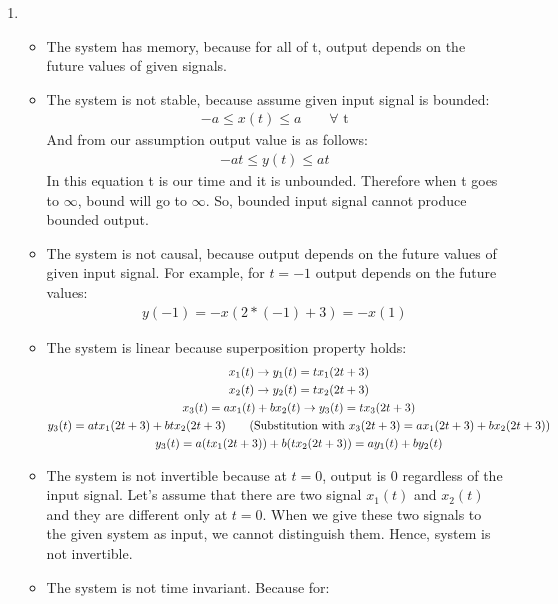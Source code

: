 \documentclass[10pt,a4paper, margin=1in]{article}
\begin{document}
\begin{enumerate}
\begin{enumerate}
    \item %
    \begin{itemize}
        \item The system has memory, because for all of t, output depends on the future values of given signals. \\
        \item The system is not stable, because assume given input signal is bounded:
        \begin{gather*}
        -a \le x(t) \le a  \text{$\qquad \forall$ t}
        \end{gather*}
        And from our assumption output value is as follows:
        \begin{gather*}
            -at \le y(t) \le at
        \end{gather*}
        In this equation t is our time and it is unbounded. Therefore when t goes to $\infty$, bound will go to $\infty$. So, bounded input signal cannot produce bounded output. \\
        \item  The system is not causal, because output depends on the future values of given input signal. For example, for $t=-1$ output depends on the future values:
        \begin{gather*}
            y(-1) = - x(2*(-1)+3) = -x(1)
        \end{gather*}
        \item The system is linear because superposition property holds:
            \begin{gather*}
            x_1(t) \rightarrow y_1(t)=tx_1(2t+3) \\
            x_2(t) \rightarrow y_2(t)=tx_2(2t+3) \\
            x_3(t)=ax_1(t)+bx_2(t) \rightarrow y_3(t)=tx_3(2t+3) \\
            y_3(t)= atx_1(2t+3)+btx_2(2t+3) \text{\qquad (Substitution with $x_3(2t+3) = ax_1(2t+3)+bx_2(2t+3)$)} \\
            y_3(t) = a(tx_1(2t+3))+b(tx_2(2t+3)) = ay_1(t)+by_2(t)
            \end{gather*}
        \item The system is not invertible because at $t=0$, output is 0 regardless of the input signal. Let's assume that there are two signal $x_1(t)$ and $x_2(t)$ and they are different only at $t=0$. When we give these two signals to the given system as input, we cannot distinguish them. Hence, system is not invertible.
        \item The system is not time invariant. Because for: 

\end{itemize}
\end{enumerate}
\end{enumerate}
\end{document}
